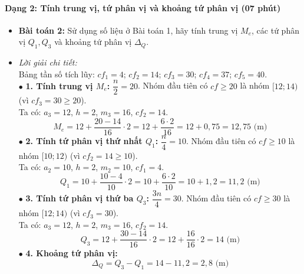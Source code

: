 \documentclass[12pt, a4paper]{article}
\begin{document}
\paragraph{Dạng 2: Tính trung vị, tứ phân vị và khoảng tứ phân vị (07 phút)}
\begin{itemize}
    \item \textbf{Bài toán 2:} Sử dụng số liệu ở Bài toán 1, hãy tính trung vị $M_e$, các tứ phân vị $Q_1, Q_3$ và khoảng tứ phân vị $\Delta_Q$.
    \item \textit{Lời giải chi tiết:}\\
    Bảng tần số tích lũy: $cf_1 = 4$; $cf_2 = 14$; $cf_3 = 30$; $cf_4 = 37$; $cf_5 = 40$.\\
    $\bullet$ \textbf{1. Tính trung vị $M_e$:}
    $\dfrac{n}{2} = 20$. Nhóm đầu tiên có $cf \ge 20$ là nhóm $[12; 14)$ (vì $cf_3 = 30 \ge 20$).\\
    Ta có: $a_3 = 12$, $h = 2$, $m_3 = 16$, $cf_2 = 14$.\\
    $$M_e = 12 + \dfrac{20 - 14}{16} \cdot 2 = 12 + \dfrac{6 \cdot 2}{16} = 12 + 0{,}75 = 12{,}75\text{ (m)}$$
    $\bullet$ \textbf{2. Tính tứ phân vị thứ nhất $Q_1$:}
    $\dfrac{n}{4} = 10$. Nhóm đầu tiên có $cf \ge 10$ là nhóm $[10; 12)$ (vì $cf_2 = 14 \ge 10$).\\
    Ta có: $a_2 = 10$, $h = 2$, $m_2 = 10$, $cf_1 = 4$.\\
    $$Q_1 = 10 + \dfrac{10 - 4}{10} \cdot 2 = 10 + \dfrac{6 \cdot 2}{10} = 10 + 1{,}2 = 11{,}2\text{ (m)}$$
    $\bullet$ \textbf{3. Tính tứ phân vị thứ ba $Q_3$:}
    $\dfrac{3n}{4} = 30$. Nhóm đầu tiên có $cf \ge 30$ là nhóm $[12; 14)$ (vì $cf_3 = 30$).\\
    Ta có: $a_3 = 12$, $h = 2$, $m_3 = 16$, $cf_2 = 14$.\\
    $$Q_3 = 12 + \dfrac{30 - 14}{16} \cdot 2 = 12 + \dfrac{16}{16} \cdot 2 = 14\text{ (m)}$$
    $\bullet$ \textbf{4. Khoảng tứ phân vị:}
    $$\Delta_Q = Q_3 - Q_1 = 14 - 11{,}2 = 2{,}8\text{ (m)}$$
\end{itemize}
\end{document}
